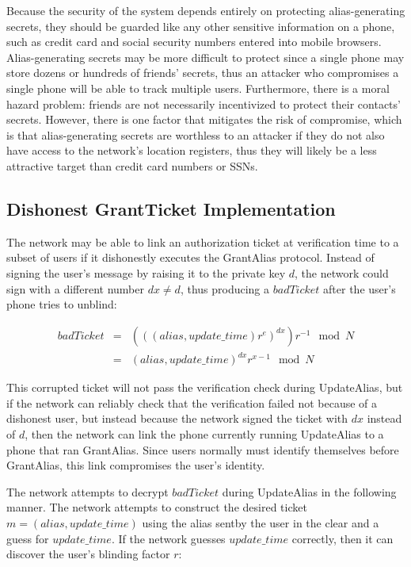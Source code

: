 \documentclass[11pt]{article}
\begin{document}
Because the security of the system depends entirely on protecting alias-generating secrets, they should be guarded like any other sensitive information on a phone, such as credit card and social security numbers entered into mobile browsers. Alias-generating secrets may be more difficult to protect since a single phone may store dozens or hundreds of friends' secrets, thus an attacker who compromises a single phone will be able to track multiple users. Furthermore, there is a moral hazard problem: friends are not necessarily incentivized to protect their contacts' secrets. However, there is one factor that mitigates the risk of compromise, which is that alias-generating secrets are worthless to an attacker if they do not also have access to the network's location registers, thus they will likely be a less attractive target than credit card numbers or SSNs.

\subsection{Dishonest GrantTicket Implementation}
The network may be able to link an authorization ticket at verification time to a subset of users if it dishonestly executes the GrantAlias protocol. Instead of signing the user's message by raising it to the private key $d$, the network could sign with a different number $dx \neq d$, thus producing a $badTicket$ after the user's phone tries to unblind:

\begin{eqnarray*}
	badTicket & = & (((alias,update\_time)r^{e})^{dx})r^{-1} \mod N \\
	& = & (alias,update\_time)^{dx}r^{x-1} \mod N 
\end{eqnarray*}

This corrupted ticket will not pass the verification check during UpdateAlias, but if the network can reliably check that the verification failed not because of a dishonest user, but instead because the network signed the ticket with $dx$ instead of $d$, then the network can link the phone currently running UpdateAlias to a phone that ran GrantAlias. Since users normally must identify themselves before GrantAlias, this link compromises the user's identity.

The network attempts to decrypt $badTicket$ during UpdateAlias in the following manner. The network attempts to construct the desired ticket $m = (alias,update\_time)$ using the alias sentby the user in the clear and a guess for $update\_time$. If the network guesses $update\_time$ correctly, then it can discover the user's blinding factor $r$:
\end{document}

